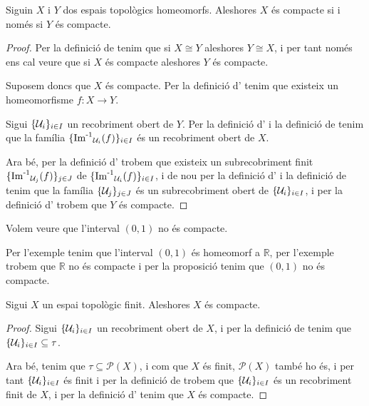 \documentclass[../../Main.tex]{subfiles}
\begin{document}
	\begin{proposition}
		\label{prop:la compacitat és una propietat topològica}
		Siguin \(X\) i \(Y\) dos espais topològics homeomorfs. Aleshores \(X\) és compacte si i només si \(Y\) és compacte.
		\begin{proof}
			Per la definició de  tenim que si \(X\cong Y\) aleshores \(Y\cong X\), i per tant només ens cal veure que si \(X\) és compacte aleshores \(Y\) és compacte.
			
			Suposem doncs que \(X\) és compacte. Per la definició d' tenim que existeix un homeomorfisme \(f\colon X\longrightarrow Y\).
			
			Sigui \(\{\mathcal{U}_{i}\}_{i\in I}\) un recobriment obert de \(Y\). Per la definició d' i la definició de  tenim que la família \(\{\operatorname{\operatorname{Im}^{-1}}_{\mathcal{U}_{i}}(f)\}_{i\in I}\) és un recobriment obert de \(X\).
			
			Ara bé, per la definició d' trobem que existeix un subrecobriment finit \(\{\operatorname{\operatorname{Im}^{-1}}_{\mathcal{U}_{j}}(f)\}_{j\in J}\) de \(\{\operatorname{\operatorname{Im}^{-1}}_{\mathcal{U}_{i}}(f)\}_{i\in I}\), i de nou per la definició d' i la definició de  tenim que la família \(\{\mathcal{U}_{j}\}_{j\in J}\) és un subrecobriment obert de \(\{\mathcal{U}_{i}\}_{i\in I}\), i per la definició d' trobem que \(Y\) és compacte.
		\end{proof}
	\end{proposition}
	\begin{example}
		\label{ex:l'interval (0,1) no és compacte}
		Volem veure que l'interval \((0,1)\) no és compacte.
		\begin{solution}
			Per l'exemple  tenim que l'interval \((0,1)\) és homeomorf a \(\mathbb{R}\), per l'exemple  trobem que \(\mathbb{R}\) no és compacte i per la proposició  tenim que \((0,1)\) no és compacte.
		\end{solution}
	\end{example}
	\begin{proposition}
		\label{prop:un espai topològic finit és compacte}
		Sigui \(X\) un espai topològic finit. Aleshores \(X\) és compacte.
		\begin{proof}
			Sigui \(\{\mathcal{U}_{i}\}_{i\in I}\) un recobriment obert de \(X\), i per la definició de  tenim que \(\{\mathcal{U}_{i}\}_{i\in I}\subseteq\tau\).
			
			Ara bé, tenim que \(\tau\subseteq\mathcal{P}(X)\), i com que \(X\) és finit, \(\mathcal{P}(X)\) també ho és, i per tant \(\{\mathcal{U}_{i}\}_{i\in I}\) és finit i per la definició de  trobem que \(\{\mathcal{U}_{i}\}_{i\in I}\) és un recobriment finit de \(X\), i per la definició d' tenim que \(X\) és compacte.
		\end{proof}
	\end{proposition}
\end{document}
